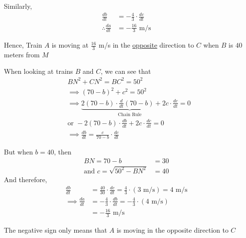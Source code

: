 \documentclass[14pt,fleqn]{extarticle}
\newcommand\dadt{\frac{da}{dt}}
\newcommand\dbdt{\frac{db}{dt}}
\newcommand\dcdt{\frac{dc}{dt}}
\begin{document}
\begin{problem}
\begin{step}
\begin{options}
     Similarly, 
     \begin{align}
     \dbdt &= -\frac{4}{3}\cdot\dcdt \\
     \therefore \dadt &= -\frac{16}{3}\text{ m/s}
\end{align}  

Hence, Train $A$ is moving at $\frac{16}{3}$ m/s in the \underline{opposite} direction to $C$ when $B$ is $40$ meters from $M$
        
    \end{options} 
     \reason 
     
     When looking at trains $B$ and $C$, we can see that 
     \begin{align}
     &BN^2 + CN^2 = BC^2 = 50^2 \\
     &\implies (70-b)^2 + c^2 = 50^2 \\ 
     &\implies \underbrace{2\left(70-b \right)\cdot \frac{d}{dt} \left(70-b \right)
     + 2c\cdot\dcdt}_{\text{Chain Rule}} = 0 \\
     &\text{or } -2 \left(70-b \right)\cdot\dbdt + 2c\cdot\dcdt = 0 \\
     &\implies \dbdt = \frac{c}{70-b}\cdot\dcdt
\end{align}

But when $b = 40$, then 
\begin{align}
	BN = 70 -b &= 30 \\
	\text{and }c = \sqrt{50^2 - BN^2} &= 40
\end{align}
And therefore,
\begin{align}
\dbdt &= \frac{40}{30}\cdot\dcdt = \frac{4}{3}\cdot \left(3\text{ m/s} \right) = 4\text{ m/s} \\
\implies \dadt &= -\frac{4}{3}\cdot\dbdt = -\frac{4}{3}\cdot \left(4\text{ m/s} \right) \\
&= -\frac{16}{3}\text{ m/s}
\end{align}

The negative sign only means that $A$ is moving in the opposite direction to $C$

\end{step}

\end{problem}
\end{document}
